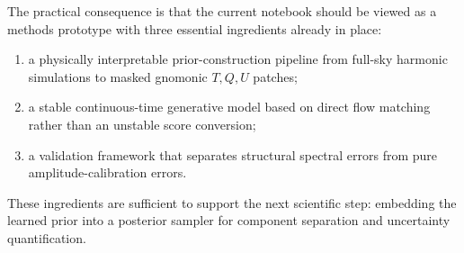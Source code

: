 \documentclass[11pt]{article}
\begin{document}
The practical consequence is that the current notebook should be viewed as a methods prototype with three essential ingredients already in place:
\begin{enumerate}[leftmargin=1.5em]
  \item a physically interpretable prior-construction pipeline from full-sky harmonic simulations to masked gnomonic \(T,Q,U\) patches;
  \item a stable continuous-time generative model based on direct flow matching rather than an unstable score conversion;
  \item a validation framework that separates structural spectral errors from pure amplitude-calibration errors.
\end{enumerate}

These ingredients are sufficient to support the next scientific step: embedding the learned prior into a posterior sampler for component separation and uncertainty quantification.
\end{document}
